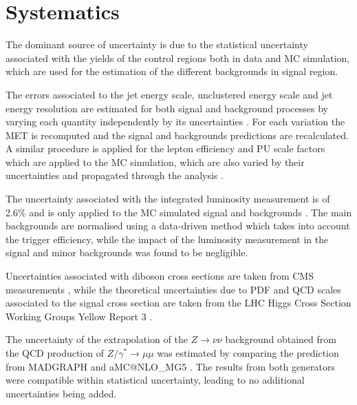 \section{Systematics}


The dominant source of uncertainty is due to the statistical uncertainty associated with the yields of the control regions both in data and \gls{MC} simulation, which are used for the estimation of the different backgrounds in signal region. 

The errors associated to the jet energy scale, unclustered energy scale and jet energy resolution are estimated for both signal and background processes by varying each quantity independently by its uncertainties \cite{ARTICLE:CMSDeterminationJetEnergyCalibration}. For each variation the \gls{MET} is recomputed and the signal and backgrounds predictions are recalculated. A similar procedure is applied for the lepton efficiency and \gls{PU} scale factors which are applied to the \gls{MC} simulation, which are also varied by their uncertainties and propagated through the analysis \cite{ARTICLE:CMSMuonReconstruction7TeV,ARTICLE:CMSElectronReconstruction8TeV}.

The uncertainty associated with the integrated luminosity measurement is of 2.6\% and is only applied to the \gls{MC} simulated signal and backgrounds \cite{ARTICLE:CMSLuminosityBasedonPixelClusterCounting}. The main backgrounds are normalised using a data-driven method which takes into account the trigger efficiency, while the impact of the luminosity measurement in the signal and minor backgrounds was found to be negligible.

Uncertainties associated with diboson cross sections are taken from \gls{CMS} measurements \cite{ARTICLE:CMSMeasurmentOfWWandZZxsec}, while the theoretical uncertainties due to \gls{PDF} and \gls{QCD} scales associated to the signal cross section are taken from the \gls{LHC} Higgs Cross Section Working Groups Yellow Report 3 \cite{ARTICLE:HandbookofLHCHiggsCrossSectionsInclusiveObservables,ARTICLE:HandbookofLHCHiggsCrossSectionsDifferentialDistributions}.

The uncertainty of the extrapolation of the  $Z\rightarrow\nu\nu$ background obtained from the \gls{QCD} production of $Z/\gamma^{*}\rightarrow\mu\mu$ was estimated by comparing the prediction from \textsc{MADGRAPH} and a\textsc{MC@NLO\_MG5} \cite{ARTICLE:aMCatNLO}. The results from both generators were compatible within statistical uncertainty, leading to no additional uncertainties being added. 


